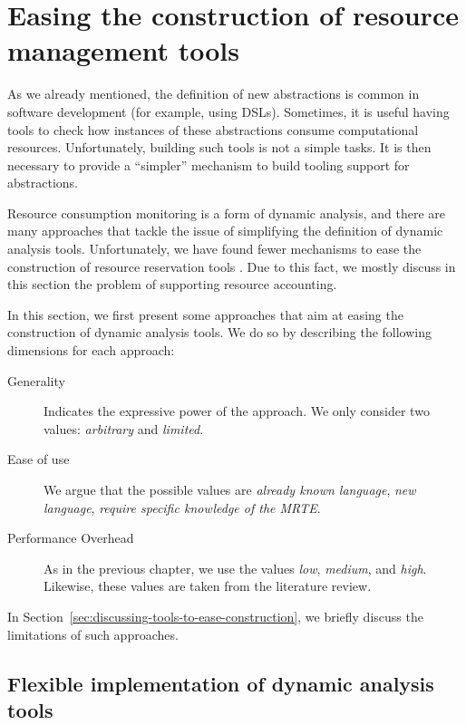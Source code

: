 \section{Easing the construction of resource management tools} \label{sec:easy-tools-contruction}

As we already mentioned, the definition of new abstractions is common in software development (for example, using DSLs).
Sometimes, it is useful having tools to check how instances of these abstractions consume computational resources.
Unfortunately, building such tools is not a simple tasks.
It is then necessary to provide a ``simpler'' mechanism to build tooling support for abstractions.

Resource consumption monitoring is a form of dynamic analysis, and there are many approaches that tackle the issue of simplifying the definition of dynamic analysis tools.
Unfortunately, we have found fewer mechanisms to ease the construction of resource reservation tools \cite{mueller}.
Due to this fact, we mostly discuss in this section the problem of supporting resource accounting. 

In this section, we first present some approaches that aim at easing the construction of dynamic analysis tools.
We do so by describing the following dimensions for each approach:

\begin{description}
\item[Generality] Indicates the expressive power of the approach. We only consider two values: \textit{arbitrary} and \textit{limited}.

\item[Ease of use] We argue that the possible values are \textit{already known language}, \textit{new language}, \textit{require specific knowledge of the MRTE}.

\item[Performance Overhead] As in the previous chapter, we use the values \textit{low}, \textit{medium}, and \textit{high}.
Likewise, these values are taken from the literature review.
\end{description}

In Section~\ref{sec:discussing-tools-to-ease-construction}, we briefly discuss the limitations of such approaches.


\subsection{Flexible implementation of dynamic analysis tools}


